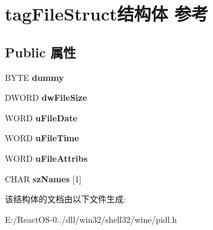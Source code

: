 \hypertarget{structtag_file_struct}{}\section{tag\+File\+Struct结构体 参考}
\label{structtag_file_struct}
\subsection*{Public 属性}
\begin{DoxyCompactItemize}
\item 
\mbox{\label{structtag_file_struct_acb84fababaeaf74f504eae15ba42bf98}} 
B\+Y\+TE {\bfseries dummy}
\item 
\mbox{\label{structtag_file_struct_a7f1c968e9f18db846447bffd1cfb3d1b}} 
D\+W\+O\+RD {\bfseries dw\+File\+Size}
\item 
\mbox{\label{structtag_file_struct_a18074539f00677e2e5eb0ab98b8c2f3b}} 
W\+O\+RD {\bfseries u\+File\+Date}
\item 
\mbox{\label{structtag_file_struct_a4aed7563b130157d5cc7affb20195623}} 
W\+O\+RD {\bfseries u\+File\+Time}
\item 
\mbox{\label{structtag_file_struct_a4519fda79cb9971501905ec4de67219d}} 
W\+O\+RD {\bfseries u\+File\+Attribs}
\item 
\mbox{\label{structtag_file_struct_ae848742a762ef6126a7cb6d541ca6772}} 
C\+H\+AR {\bfseries sz\+Names} \mbox{[}1\mbox{]}
\end{DoxyCompactItemize}


该结构体的文档由以下文件生成\+:\begin{DoxyCompactItemize}
\item 
E\+:/\+React\+O\+S-\/0../dll/win32/shell32/wine/pidl.\+h\end{DoxyCompactItemize}
